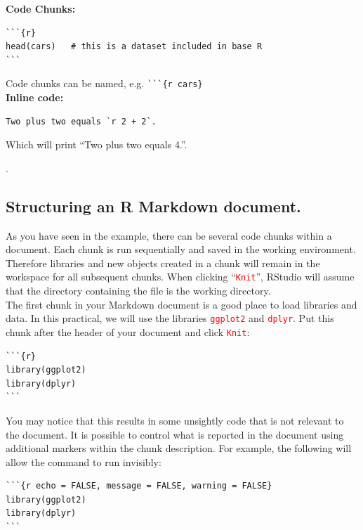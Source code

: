 \documentclass[a4paper,12pt]{article}
\newcommand\code[1]{\textcolor{red}{\texttt{#1}}}
\begin{document}
\textbf{Code Chunks:}
\begin{shaded}
\begin{verbatim}
```{r}
head(cars)   # this is a dataset included in base R
```
\end{verbatim}
\end{shaded}

Code chunks can be named, e.g. \verb!```{r cars}! \\

\textbf{Inline code:}
\begin{shaded}
\begin{verbatim}
Two plus two equals `r 2 + 2`.
\end{verbatim}
\end{shaded}

Which will print ``Two plus two equals 4.''.

\vspace*{-1cm}.

\subsection{Structuring an R Markdown document.}

As you have seen in the example, there can be several code chunks within a document. Each chunk is run sequentially and saved in the working environment. Therefore libraries and new objects created in a chunk will remain in the workspace for all subsequent chunks. When clicking ``\code{Knit}'', RStudio will assume that the directory containing the file is the working directory. \\

The first chunk in your Markdown document is a good place to load libraries and data. In this practical, we will use the libraries \code{ggplot2} and \code{dplyr}. Put this chunk after the header of your document and click \code{Knit}:

\begin{shaded}
\begin{verbatim}
```{r}
library(ggplot2)
library(dplyr)
```
\end{verbatim}
\end{shaded}

You may notice that this results in some unsightly code that is not relevant to the document. It is possible to control what is reported in the document using additional markers within the chunk description. For example, the following will allow the command to run invisibly:

\begin{shaded}
\begin{verbatim}
```{r echo = FALSE, message = FALSE, warning = FALSE}
library(ggplot2)
library(dplyr)
```
\end{verbatim}
\end{shaded}
\end{document}
